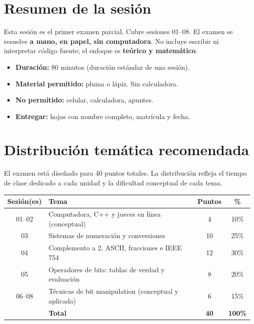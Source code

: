 \documentclass[12pt, oneside]{article}
\begin{document}

\tableofcontents
\newpage

\section{Resumen de la sesión}

Esta sesión es el primer examen parcial.  Cubre sesiones 01–08.
El examen se resuelve \textbf{a mano, en papel, sin computadora}.
No incluye escribir ni interpretar código fuente; el enfoque es
\textbf{teórico y matemático}.

\begin{notaprofesor}[Logística]
  \begin{itemize}
    \item \textbf{Duración:} 80 minutos (duración estándar de una sesión).
    \item \textbf{Material permitido:} pluma o lápiz.  Sin calculadora.
    \item \textbf{No permitido:} celular, calculadora, apuntes.
    \item \textbf{Entregar:} hojas con nombre completo, matrícula y fecha.
  \end{itemize}
\end{notaprofesor}

\section{Distribución temática recomendada}

El examen está diseñado para 40 puntos totales.
La distribución refleja el tiempo de clase dedicado a cada unidad y la
dificultad conceptual de cada tema.

\begin{center}
\begin{tabular}{clcc}
  \toprule
  \textbf{Sesión(es)} & \textbf{Tema} & \textbf{Puntos} & \textbf{\%} \\
  \midrule
  01–02 & Computadora, C++ y jueces en línea (conceptual) & 4  & 10\% \\
  03    & Sistemas de numeración y conversiones            & 10 & 25\% \\
  04    & Complemento a 2, ASCII, fracciones e IEEE 754   & 12 & 30\% \\
  05    & Operadores de bits: tablas de verdad y evaluación & 8 & 20\% \\
  06–08 & Técnicas de bit manipulation (conceptual y aplicada) & 6 & 15\% \\
  \bottomrule
  & \textbf{Total} & \textbf{40} & \textbf{100\%} \\
  \bottomrule
\end{tabular}
\end{center}
\end{document}
